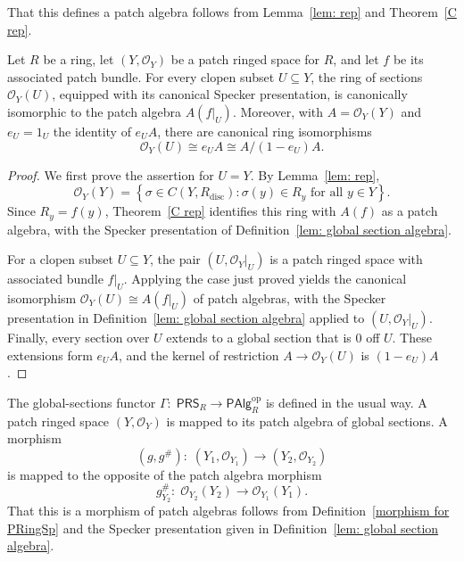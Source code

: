 \documentclass[11pt]{amsart}
\def\O{{\mathcal{O}}}
\begin{document}
That this defines a patch algebra follows from Lemma~\ref{lem: rep} and Theorem~\ref{C rep}.

\begin{theorem}\label{thm: patch ringed space 2}
Let $R$ be a ring, let $(Y,\mathcal O_Y)$ be a patch ringed space for $R$, and let $f$ be its associated patch bundle. For every clopen subset $U\subseteq Y$, the  ring of sections $\mathcal O_Y(U)$, equipped with its canonical Specker presentation, is canonically isomorphic to the patch algebra $A(f|_U)$.
Moreover, with $A=\mathcal O_Y(Y)$ and $e_U=1_U$ the identity of $e_UA$, there are canonical ring isomorphisms
$$
\mathcal O_Y(U)\cong e_UA\cong A/(1-e_U)A.
$$
\end{theorem}
\begin{proof}
We first prove the assertion for $U=Y$. By Lemma~\ref{lem: rep},   $$\mathcal O_Y(Y) =
\left\{\sigma \in C(Y,R_{\mathrm{disc}}): \sigma(y)\in R_y \text{ for all } y\in Y \right\}.$$
Since $R_y=f(y)$, Theorem~\ref{C rep} identifies this ring with $A(f)$ as a patch algebra, with the Specker presentation of Definition~\ref{lem: global section algebra}.

For a clopen subset $U\subseteq Y$, the pair $(U,\mathcal O_Y|_U)$ is a patch ringed space with associated bundle $f|_U$. Applying the case just proved yields the canonical isomorphism $\mathcal O_Y(U)\cong A(f|_U)$ of patch algebras, with the Specker presentation in  Definition~\ref{lem: global section algebra} applied to $(U,\mathcal O_Y|_U)$.
Finally, every section over $U$ extends   to a global section that is $0$ off $U$. These extensions form $e_UA$, and the kernel of restriction $A\to\mathcal O_Y(U)$ is $(1-e_U)A$.
\end{proof}

The global-sections functor $\Gamma\colon\;\mathsf{PRS}_R\to\mathsf{PAlg}_R^{\mathrm{op}}$ is defined in the usual way. A patch ringed space $(Y,\O_Y)$ is mapped to its patch algebra of global sections. A morphism
\[
(g,g^\#)\colon\; (Y_1,\O_{Y_1})\longrightarrow(Y_2,\O_{Y_2})
\]
is mapped to the opposite of the patch algebra morphism
\[
g^\#_{Y_2}\colon\; \O_{Y_2}(Y_2)\longrightarrow\O_{Y_1}(Y_1).
\]
That this is a morphism of patch algebras follows from Definition~\ref{morphism for PRingSp} and the Specker presentation given in Definition~\ref{lem: global section algebra}.
\end{document}
